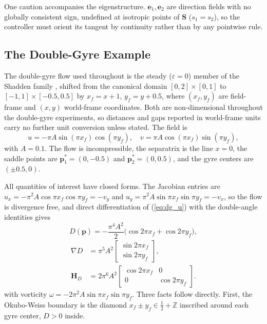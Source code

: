\documentclass[lettersize,journal]{IEEEtran}
\begin{document}
One caution accompanies the eigenstructure. $\mathbf{e}_1, \mathbf{e}_2$ are direction fields
with no globally consistent sign, undefined at isotropic points of
$\mathbf{S}$ ($s_1 = s_2$), so the controller must orient its tangent by
continuity rather than by any pointwise rule.

\subsection{The Double-Gyre Example}
\label{sec:dg_example}

The double-gyre flow used throughout is the steady ($\varepsilon = 0$)
member of the Shadden family \cite{15}, shifted from the canonical domain
$[0,2] \times [0,1]$ to $[-1,1] \times [-0.5, 0.5]$ by
$x_f = x + 1$, $y_f = y + 0.5$, where $(x_f, y_f)$ are field-frame and
$(x, y)$ world-frame coordinates. Both are non-dimensional throughout the
double-gyre experiments, so distances and gaps reported in world-frame
units carry no
further unit conversion unless stated. The field is
\begin{equation}
    u = -\pi A \sin(\pi x_f) \cos(\pi y_f), \quad
    v = \pi A \cos(\pi x_f) \sin(\pi y_f),
    \label{eq:dg_u}
\end{equation}
with $A = 0.1$. The flow is incompressible, the separatrix is the line
$x = 0$, the saddle points are $\mathbf{p}^*_1 = (0, -0.5)$ and
$\mathbf{p}^*_2 = (0, 0.5)$, and the gyre centers are $(\pm 0.5, 0)$.

All quantities of interest have closed forms. The Jacobian entries are
$u_x = -\pi^2 A \cos\pi x_f \cos\pi y_f = -v_y$ and
$u_y = \pi^2 A \sin\pi x_f \sin\pi y_f = -v_x$, so the flow is divergence
free, and direct differentiation of (\ref{eq:dg_u}) with the double-angle
identities gives
\begin{equation}
    D(\mathbf{p}) = -\frac{\pi^4 A^2}{2}
    \bigl(\cos 2\pi x_f + \cos 2\pi y_f\bigr),
    \label{eq:det_analytic_main}
\end{equation}
\begin{equation}
    \begin{aligned}
    \nabla D &= \pi^5 A^2
    \begin{bmatrix} \sin 2\pi x_f \\ \sin 2\pi y_f \end{bmatrix},
    \\
    \mathbf{H}_D &= 2\pi^6 A^2
    \begin{bmatrix} \cos 2\pi x_f & 0 \\ 0 & \cos 2\pi y_f \end{bmatrix}.
    \end{aligned}
    \label{eq:gradhess_analytic_main}
\end{equation}
with vorticity $\omega = -2\pi^2 A \sin\pi x_f \sin\pi y_f$. Three facts
follow directly. First, the Okubo-Weiss boundary is the diamond
$x_f \pm y_f \in \tfrac{1}{2} + \mathbb{Z}$ inscribed around each gyre
center, $D > 0$ inside.
\end{document}
